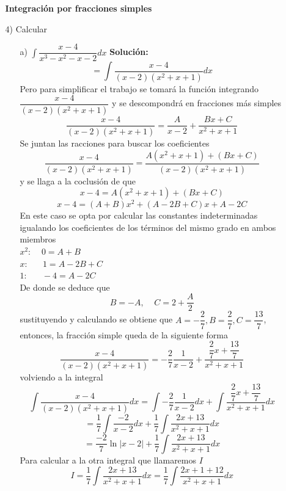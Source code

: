\documentclass[10pt,twoside]{SelfArx} %
\begin{document}
\begin{enumerate}
\begin{enumerate}
\textbf{Integración por fracciones simples}\\
\item[4)] Calcular
\begin{enumerate}
	\item[a)] $ \int \dfrac{x-4}{x^{3}-x^{2}-x-2}dx $
	\textbf{Solución:}\\
	\begin{equation}
	=\int \dfrac{x-4}{(x-2)(x^{2}+x+1)}dx
	\end{equation}
	Pero para simplificar el trabajo se tomará la función integrando $ \dfrac{x-4}{(x-2)(x^{2}+x+1)} $ y se descompondrá en fracciones más simples
\[ 	\dfrac{x-4}{(x-2)(x^{2}+x+1)}= \dfrac{A}{x-2}+\dfrac{Bx+C}{x^{2}+x+1}\]
Se juntan las racciones para buscar los coeficientes
\[  	\dfrac{x-4}{(x-2)(x^{2}+x+1)}=\dfrac{A(x^{2}+x+1)+(Bx+C)}{(x-2)(x^{2}+x+1)} \]
y se llaga a la coclusi\'on de que
	\[ x-4=A(x^{2}+x+1)+(Bx+C) \]
	\[ x-4=(A+B)x^{2}+(A-2B+C)x+A-2C \]
	En este caso se opta por calcular las constantes indeterminadas igualando los coeficientes de los términos del mismo grado en ambos miembros\\
	$  x^{2}:\;\;\;\;0=A+B  $\\
$ 	 x:\;\;\;\;\;\;1=A-2B+C $ \\
$ 	 1:\;\;\;\;\;\;-4=A-2C  $\\
De donde se deduce que 
\[ B=-A, \;\;\;\; C=2+\dfrac{A}{2} \]
sustituyendo y calculando se obtiene que $ A=-\dfrac{2}{7} , B=\dfrac{2}{7}, C=\dfrac{13}{7}$, entonces, la fracción simple queda de la siguiente forma
\[ \dfrac{x-4}{(x-2)(x^{2}+x+1)}=-\dfrac{2}{7}\dfrac{1}{x-2}+\dfrac{\dfrac{2}{7}x+\dfrac{13}{7}}{x^{2}+x+1}  \]
volviendo a la integral
\begin{equation}
\int\dfrac{x-4}{(x-2)(x^{2}+x+1)}dx=\int-\dfrac{2}{7}\dfrac{1}{x-2}dx+\int\dfrac{\dfrac{2}{7}x+\dfrac{13}{7}}{x^{2}+x+1}dx
\end{equation}
\begin{equation}
=\dfrac{1}{7}\int\dfrac{-2}{x-2}dx+\dfrac{1}{7}\int\dfrac{2x+13}{x^{2}+x+1}dx
\end{equation}
\begin{equation}
=\dfrac{-2}{7}\ln|x-2|+\dfrac{1}{7}\int\dfrac{2x+13}{x^{2}+x+1}dx
\end{equation}
Para calcular a la otra integral que llamaremos $ I $
\begin{equation}
I=\dfrac{1}{7}\int\dfrac{2x+13}{x^{2}+x+1}dx=\dfrac{1}{7}\int\dfrac{2x+1+12}{x^{2}+x+1}dx
\end{equation}
\begin{equation}

\end{equation}
\end{enumerate}
\end{enumerate}
\end{enumerate}
\end{document}
